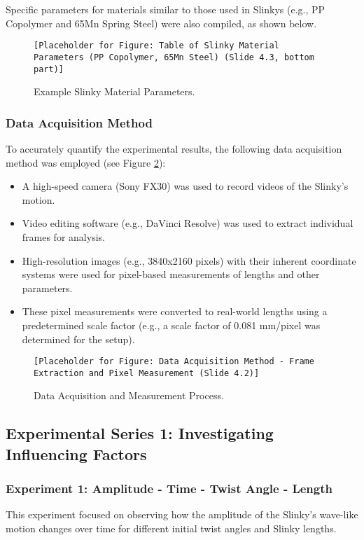 \documentclass{mcmthesis}  %
\begin{document}
Specific parameters for materials similar to those used in Slinkys (e.g., PP Copolymer and 65Mn Spring Steel) were also compiled, as shown below.

\begin{figure}[h!]
    \centering
    \texttt{[Placeholder for Figure: Table of Slinky Material Parameters (PP Copolymer, 65Mn Steel) (Slide 4.3, bottom part)]}
    \caption{Example Slinky Material Parameters.}
    \label{fig:slinky_material_params}
\end{figure}

\subsubsection{Data Acquisition Method}
To accurately quantify the experimental results, the following data acquisition method was employed (see Figure \ref{fig:data_acquisition_method}):
\begin{itemize}
    \item A high-speed camera (Sony FX30) was used to record videos of the Slinky's motion.
    \item Video editing software (e.g., DaVinci Resolve) was used to extract individual frames for analysis.
    \item High-resolution images (e.g., 3840x2160 pixels) with their inherent coordinate systems were used for pixel-based measurements of lengths and other parameters.
    \item These pixel measurements were converted to real-world lengths using a predetermined scale factor (e.g., a scale factor of 0.081 mm/pixel was determined for the setup).
\end{itemize}

\begin{figure}[h!]
    \centering
    \texttt{[Placeholder for Figure: Data Acquisition Method - Frame Extraction and Pixel Measurement (Slide 4.2)]}
    \caption{Data Acquisition and Measurement Process.}
    \label{fig:data_acquisition_method}
\end{figure}

\subsection{Experimental Series 1: Investigating Influencing Factors}

\subsubsection{Experiment 1: Amplitude - Time - Twist Angle - Length}
This experiment focused on observing how the amplitude of the Slinky's wave-like motion changes over time for different initial twist angles and Slinky lengths.
\end{document}

